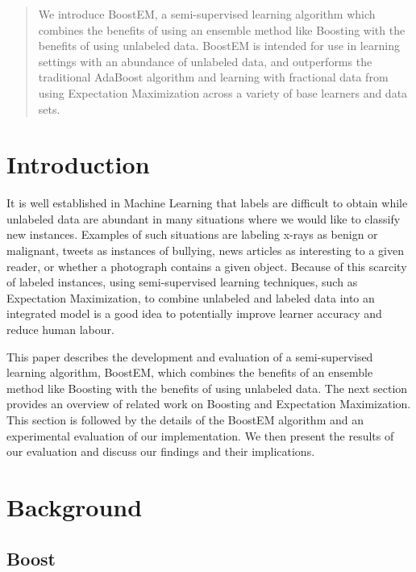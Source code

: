 \documentclass{sig-alternate}
\begin{document}
\maketitle
\begin{abstract}
We introduce BoostEM, a semi-supervised learning algorithm which combines the benefits of using an ensemble method like Boosting with the benefits of using unlabeled data.  BoostEM is intended for use in learning settings with an abundance of unlabeled data, and outperforms the traditional AdaBoost algorithm and learning with fractional data from using Expectation Maximization across a variety of base learners and data sets.
\end{abstract}

\section{Introduction}

It is well established in Machine Learning that labels are difficult to obtain while unlabeled data are abundant in many situations where we would like to classify new instances. Examples of such situations are labeling x-rays as benign or malignant, tweets as instances of bullying, news articles as interesting to a given reader, or whether a photograph contains a given object. Because of this scarcity of labeled instances, using semi-supervised learning techniques, such as Expectation Maximization, to combine unlabeled and labeled data into an integrated model is a good idea to potentially improve learner accuracy and reduce human labour.

This paper describes the development and evaluation of a semi-supervised learning algorithm, BoostEM, which combines the benefits of an ensemble method like Boosting with the benefits of using unlabeled data. The next section provides an overview of related work on Boosting and Expectation Maximization. This section is followed by the details of the BoostEM algorithm and an experimental evaluation of our implementation. We then present the results of our evaluation and discuss our findings and their implications.

\section{Background}
\subsection{Boost}
\end{document}
